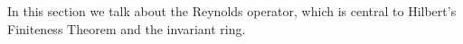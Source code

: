 In this section we talk about the Reynolds operator, which is central to Hilbert's Finiteness Theorem and the invariant ring.


